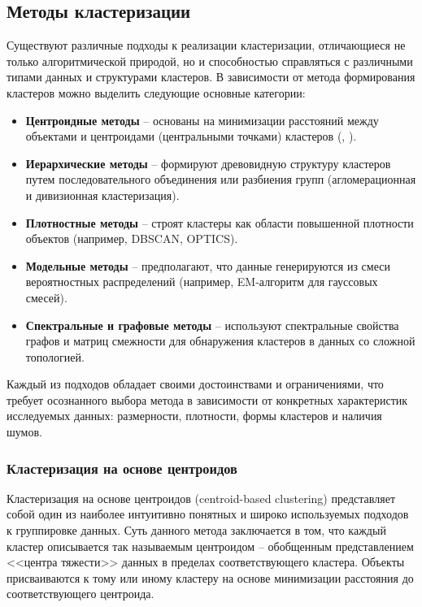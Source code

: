     \subsection{Методы кластеризации}
        Существуют различные подходы к реализации кластеризации, отличающиеся не только алгоритмической природой, но и способностью справляться с различными типами данных и структурами кластеров. В зависимости от метода формирования кластеров можно выделить следующие основные категории:

        \begin{itemize}
            \item \textbf{Центроидные методы} -- основаны на минимизации расстояний между объектами и центроидами (центральными точками) кластеров (\kmeans{}, \kmedoids{}).
            \item \textbf{Иерархические методы} -- формируют древовидную структуру кластеров путем последовательного объединения или разбиения групп (агломерационная и дивизионная кластеризация).
            \item \textbf{Плотностные методы} -- строят кластеры как области повышенной плотности объектов (например, DBSCAN, OPTICS).
            \item \textbf{Модельные методы} -- предполагают, что данные генерируются из смеси вероятностных распределений (например, EM-алгоритм для гауссовых смесей).
            \item \textbf{Спектральные и графовые методы} -- используют спектральные свойства графов и матриц смежности для обнаружения кластеров в данных со сложной топологией.
        \end{itemize}

        Каждый из подходов обладает своими достоинствами и ограничениями, что требует осознанного выбора метода в зависимости от конкретных характеристик исследуемых данных: размерности, плотности, формы кластеров и наличия шумов.

        \subsubsection{Кластеризация на основе центроидов}

            Кластеризация на основе центроидов (centroid-based clustering) представляет собой один из наиболее интуитивно понятных и широко используемых подходов к группировке данных. Суть данного метода заключается в том, что каждый кластер описывается так называемым центроидом -- обобщенным представлением <<центра тяжести>> данных в пределах соответствующего кластера. Объекты присваиваются к тому или иному кластеру на основе минимизации расстояния до соответствующего центроида.

